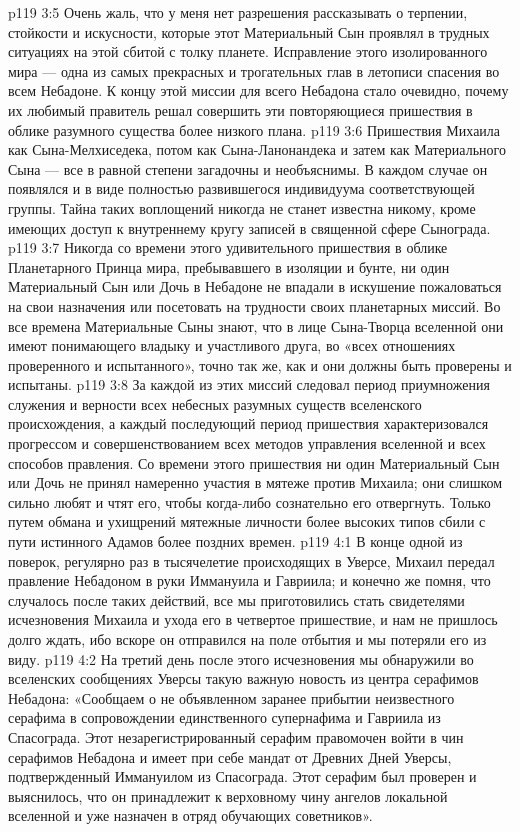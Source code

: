 \vs p119 3:5 Очень жаль, что у меня нет разрешения рассказывать о терпении, стойкости и искусности, которые этот Материальный Сын проявлял в трудных ситуациях на этой сбитой с толку планете. Исправление этого изолированного мира --- одна из самых прекрасных и трогательных глав в летописи спасения во всем Небадоне. К концу этой миссии для всего Небадона стало очевидно, почему их любимый правитель решал совершить эти повторяющиеся пришествия в облике разумного существа более низкого плана.
\vs p119 3:6 \pc Пришествия Михаила как Сына\hyp{}Мелхиседека, потом как Сына\hyp{}Ланонандека и затем как Материального Сына --- все в равной степени загадочны и необъяснимы. В каждом случае он появлялся  и в виде полностью развившегося индивидуума соответствующей группы. Тайна таких воплощений никогда не станет известна никому, кроме имеющих доступ к внутреннему кругу записей в священной сфере Сынограда.
\vs p119 3:7 \pc Никогда со времени этого удивительного пришествия в облике Планетарного Принца мира, пребывавшего в изоляции и бунте, ни один Материальный Сын или Дочь в Небадоне не впадали в искушение пожаловаться на свои назначения или посетовать на трудности своих планетарных миссий. Во все времена Материальные Сыны знают, что в лице Сына\hyp{}Творца вселенной они имеют понимающего владыку и участливого друга, во «всех отношениях проверенного и испытанного», точно так же, как и они должны быть проверены и испытаны.
\vs p119 3:8 За каждой из этих миссий следовал период приумножения служения и верности всех небесных разумных существ вселенского происхождения, а каждый последующий период пришествия характеризовался прогрессом и совершенствованием всех методов управления вселенной и всех способов правления. Со времени этого пришествия ни один Материальный Сын или Дочь не принял намеренно участия в мятеже против Михаила; они слишком сильно любят и чтят его, чтобы когда\hyp{}либо сознательно его отвергнуть. Только путем обмана и ухищрений мятежные личности более высоких типов сбили с пути истинного Адамов более поздних времен.
\vs p119 4:1 В конце одной из поверок, регулярно раз в тысячелетие происходящих в Уверсе, Михаил передал правление Небадоном в руки Иммануила и Гавриила; и конечно же помня, что случалось после таких действий, все мы приготовились стать свидетелями исчезновения Михаила и ухода его в четвертое пришествие, и нам не пришлось долго ждать, ибо вскоре он отправился на поле отбытия и мы потеряли его из виду.
\vs p119 4:2 На третий день после этого исчезновения мы обнаружили во вселенских сообщениях Уверсы такую важную новость из центра серафимов Небадона: «Сообщаем о не объявленном заранее прибытии неизвестного серафима в сопровождении единственного супернафима и Гавриила из Спасограда. Этот незарегистрированный серафим правомочен войти в чин серафимов Небадона и имеет при себе мандат от Древних Дней Уверсы, подтвержденный Иммануилом из Спасограда. Этот серафим был проверен и выяснилось, что он принадлежит к верховному чину ангелов локальной вселенной и уже назначен в отряд обучающих советников».
